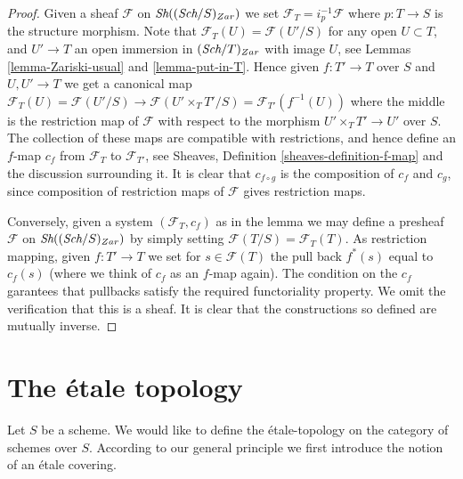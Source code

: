 \begin{proof}
Given a sheaf $\mathcal{F}$ on $\mathop{\textit{Sh}}\nolimits((\textit{Sch}/S)_{Zar})$
we set $\mathcal{F}_T = i_p^{-1}\mathcal{F}$ where $p : T \to S$
is the structure morphism. Note that
$\mathcal{F}_T(U) = \mathcal{F}(U'/S)$ for any open $U \subset T$,
and $U' \to T$ an open immersion in $(\textit{Sch}/T)_{Zar}$
with image $U$, see Lemmas \ref{lemma-Zariski-usual} and \ref{lemma-put-in-T}.
Hence given $f : T' \to T$ over $S$ and $U, U' \to T$ we get a canonical
map $\mathcal{F}_T(U) = \mathcal{F}(U'/S) \to \mathcal{F}(U'\times_T T'/S)
= \mathcal{F}_{T'}(f^{-1}(U))$ where the middle is the restriction map
of $\mathcal{F}$ with respect to the morphism
$U' \times_T T' \to U'$ over $S$. The collection of these maps are
compatible with restrictions, and hence define an $f$-map $c_f$
from $\mathcal{F}_T$ to $\mathcal{F}_{T'}$, see
Sheaves, Definition \ref{sheaves-definition-f-map} and the discussion
surrounding it. It is clear that $c_{f \circ g}$ is the composition of
$c_f$ and $c_g$, since composition of restriction maps of $\mathcal{F}$
gives restriction maps.

\medskip\noindent
Conversely, given a system $(\mathcal{F}_T, c_f)$ as in the lemma
we may define a presheaf $\mathcal{F}$ on $\mathop{\textit{Sh}}\nolimits((\textit{Sch}/S)_{Zar})$
by simply setting $\mathcal{F}(T/S) = \mathcal{F}_T(T)$. As restriction
mapping, given $f : T' \to T$ we set for $s \in \mathcal{F}(T)$
the pull back $f^*(s)$ equal to $c_f(s)$ (where we think of $c_f$ as
an $f$-map again). The condition on the $c_f$ garantees that
pullbacks satisfy the required functoriality property.
We omit the verification that this is a sheaf.
It is clear that the constructions so defined are mutually inverse.
\end{proof}























\section{The \'etale topology}
\label{section-etale}

\noindent
Let $S$ be a scheme. We would like to define the \'etale-topology on
the category of schemes over $S$. According to our general principle
we first introduce the notion of an \'etale covering.

